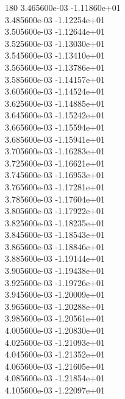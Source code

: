 180	3.465600e-03	-1.11860e+01	\\ 	3.485600e-03	-1.12254e+01	\\ 	3.505600e-03	-1.12644e+01	\\ 	3.525600e-03	-1.13030e+01	\\ 	3.545600e-03	-1.13410e+01	\\ 	3.565600e-03	-1.13786e+01	\\ 	3.585600e-03	-1.14157e+01	\\ 	3.605600e-03	-1.14524e+01	\\ 	3.625600e-03	-1.14885e+01	\\ 	3.645600e-03	-1.15242e+01	\\ 	3.665600e-03	-1.15594e+01	\\ 	3.685600e-03	-1.15941e+01	\\ 	3.705600e-03	-1.16283e+01	\\ 	3.725600e-03	-1.16621e+01	\\ 	3.745600e-03	-1.16953e+01	\\ 	3.765600e-03	-1.17281e+01	\\ 	3.785600e-03	-1.17604e+01	\\ 	3.805600e-03	-1.17922e+01	\\ 	3.825600e-03	-1.18235e+01	\\ 	3.845600e-03	-1.18543e+01	\\ 	3.865600e-03	-1.18846e+01	\\ 	3.885600e-03	-1.19144e+01	\\ 	3.905600e-03	-1.19438e+01	\\ 	3.925600e-03	-1.19726e+01	\\ 	3.945600e-03	-1.20009e+01	\\ 	3.965600e-03	-1.20288e+01	\\ 	3.985600e-03	-1.20561e+01	\\ 	4.005600e-03	-1.20830e+01	\\ 	4.025600e-03	-1.21093e+01	\\ 	4.045600e-03	-1.21352e+01	\\ 	4.065600e-03	-1.21605e+01	\\ 	4.085600e-03	-1.21854e+01	\\ 	4.105600e-03	-1.22097e+01	\\ \hline
